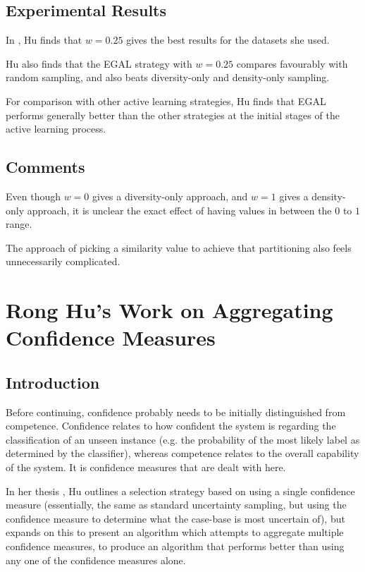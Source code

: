 \documentclass[a4paper,11pt]{report}
\begin{document}
\subsection{Experimental Results}
In \citet{Hu2011}, Hu finds that $w=0.25$ gives the best results for the datasets she used. 

Hu also finds that the EGAL strategy with $w=0.25$ compares favourably with random sampling, and also beats diversity-only and density-only sampling.

For comparison with other active learning strategies, Hu finds that EGAL performs generally better than the other strategies at the initial stages of the active learning process.

\subsection{Comments}
Even though $w=0$ gives a diversity-only approach, and $w=1$ gives a density-only approach, it is unclear the exact effect of having values in between the $0$ to $1$ range.

The approach of picking a similarity value to achieve that partitioning also feels unnecessarily complicated.

\section{Rong Hu's Work on Aggregating Confidence Measures}
\subsection{Introduction}
Before continuing, confidence probably needs to be initially distinguished from competence. Confidence relates to how confident the system is regarding the classification of an unseen instance (e.g. the probability of the most likely label as determined by the classifier), whereas competence relates to the overall capability of the system. It is confidence measures that are dealt with here.

In her thesis \citep{Hu2011}, Hu outlines a selection strategy based on using a single confidence measure (essentially, the same as standard uncertainty sampling, but using the confidence measure to determine what the case-base is most uncertain of), but expands on this to present an algorithm which attempts to aggregate multiple confidence measures, to produce an algorithm that performs better than using any one of the confidence measures alone.
\end{document}

